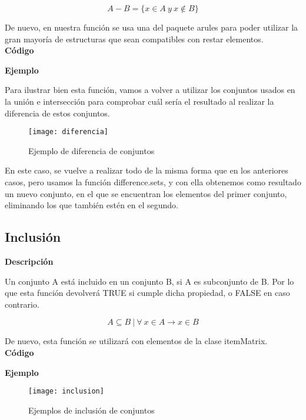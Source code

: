     \[
        A - B = \{x\in A ~ y ~ x\notin B \}
    \]

    De nuevo, en nuestra funci\'on se usa una del paquete arules para poder utilizar la gran mayor\'ia de estructuras 
    que sean compatibles con restar elementos.
    \\


    \textbf{C\'odigo}

    
    \bigskip

    \textbf{Ejemplo}

    Para ilustrar bien esta funci\'on, vamos a volver a utilizar los conjuntos usados en la uni\'on e intersecci\'on para comprobar 
    cu\'al ser\'ia el resultado al realizar la diferencia de estos conjuntos.

    \begin{figure}[H]
        \centering
        \texttt{[image: diferencia]}
        \caption{Ejemplo de diferencia de conjuntos}
        \label{fig:diferencia}
    \end{figure}

    En este caso, se vuelve a realizar todo de la misma forma que en los anteriores casos, pero usamos la funci\'on difference.sets, y 
    con ella obtenemos como resultado un nuevo conjunto, en el que se encuentran los elementos del primer conjunto, eliminando los que 
    tambi\'en est\'en en el segundo.
    \clearpage


\subsection{Inclusi\'on}

    \textbf{Descripci\'on}

    Un conjunto A est\'a incluido en un conjunto B, si A es subconjunto de B. Por lo que esta funci\'on 
    devolver\'a TRUE si cumple dicha propiedad, o FALSE en caso contrario.

    \[
        A \subseteq B ~ | ~  \forall ~ x \in A \to x \in B 
    \]

    De nuevo, esta funci\'on se utilizar\'a con elementos de la clase itemMatrix.
    \\

    \textbf{C\'odigo}

    
    \bigskip

    \textbf{Ejemplo}

    \begin{figure}[H]
        \centering
        \texttt{[image: inclusion]}
        \caption{Ejemplos de inclusi\'on de conjuntos}
        \label{fig:inclusion}
    \end{figure}

